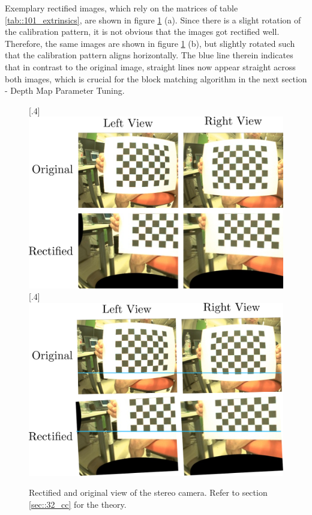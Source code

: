 Exemplary rectified images, which rely on the matrices of table \ref{tab::101_extrinsics}, are shown in figure \ref{fig::101_rect} (a). Since there is a slight rotation of the calibration pattern, it is not obvious that the images got rectified well. Therefore, the same images are shown in figure \ref{fig::101_rect} (b), but slightly rotated such that the calibration pattern aligns horizontally. The blue line therein indicates that in contrast to the original image, straight lines now appear straight across both images, which is crucial for the block matching algorithm in the next section - Depth Map Parameter Tuning.
\begin{figure}[h!]
	\centering
	[.4\linewidth]{\includegraphics[scale=.25]{chapters/10_image_processing_experiments/img/rect.png}}
	[.4\linewidth]{\includegraphics[scale=.25]{chapters/10_image_processing_experiments/img/rect_line.png}}
	\caption{Rectified and original view of the stereo camera. Refer to section \ref{sec::32_cc} for the theory.}
	\label{fig::101_rect}
\end{figure}

